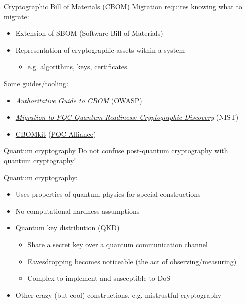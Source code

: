 \begin{frame}{Cryptographic Bill of Materials (CBOM)}
  Migration requires knowing what to migrate:
  \begin{itemize}[<+(1)->]
    \item Extension of SBOM (Software Bill of Materials)
    \item Representation of cryptographic assets within a system
    \begin{itemize}
      \item e.g. algorithms, keys, certificates
    \end{itemize}
  \end{itemize}

  \vspace*{1em}

  \pause
  Some guides/tooling:
  \begin{itemize}[<+(1)->]
    \item \href{https://cyclonedx.org/guides/OWASP_CycloneDX-Authoritative-Guide-to-CBOM-en.pdf}{\textit{Authoritative Guide to CBOM}} (OWASP)
    \item \href{https://www.nccoe.nist.gov/sites/default/files/2023-12/pqc-migration-nist-sp-1800-38b-preliminary-draft.pdf}{\textit{Migration to PQC Quantum Readiness: Cryptographic Discovery}} (NIST)
    \item \href{https://github.com/cbomkit}{CBOMkit} (\href{https://pqca.org}{PQC Alliance})
  \end{itemize}
\end{frame}

\begin{frame}{Quantum cryptography}
  Do not confuse post-quantum cryptography with quantum cryptography!

  \vspace*{1em}

  \pause
  Quantum cryptography:
  \begin{itemize}[<+(1)->]
    \item Uses properties of quantum physics for special constructions
    \item No computational hardness assumptions
    \item Quantum key distribution (QKD)
    \begin{itemize}
      \item Share a secret key over a quantum communication channel
      \item Eavesdropping becomes noticeable (the act of observing/measuring)
      \item Complex to implement and susceptible to DoS
    \end{itemize}
    \item Other crazy (but cool) constructions, e.g. mistrustful cryptography
  \end{itemize}
\end{frame}


